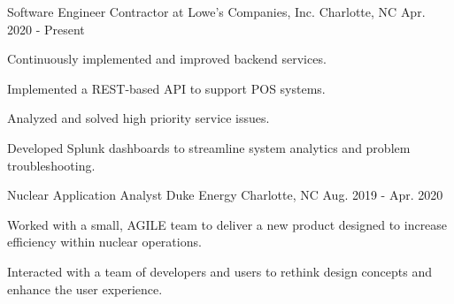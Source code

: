 

\begin{cventries}

  \cventry
    {Software Engineer}
    {Contractor at Lowe's Companies, Inc.}
    {Charlotte, NC}
    {Apr. 2020 - Present}
    {
        \begin{cvitems}
            \item {Continuously implemented and improved backend services.}
            \item{Implemented a REST-based API to support POS systems.}
            \item{Analyzed and solved high priority service issues.}
            \item{Developed Splunk dashboards to streamline system analytics and problem troubleshooting.}
        \end{cvitems}
    }
  \cventry
    {Nuclear Application Analyst}
    {Duke Energy}
    {Charlotte, NC}
    {Aug. 2019 - Apr. 2020}
    {
        \begin{cvitems}
            \item {Worked with a small, AGILE team to deliver a new product designed to increase efficiency within nuclear operations.}
            \item {Interacted with a team of developers and users to rethink design concepts and enhance the user experience.}

\end{cvitems}}
\end{cventries}

